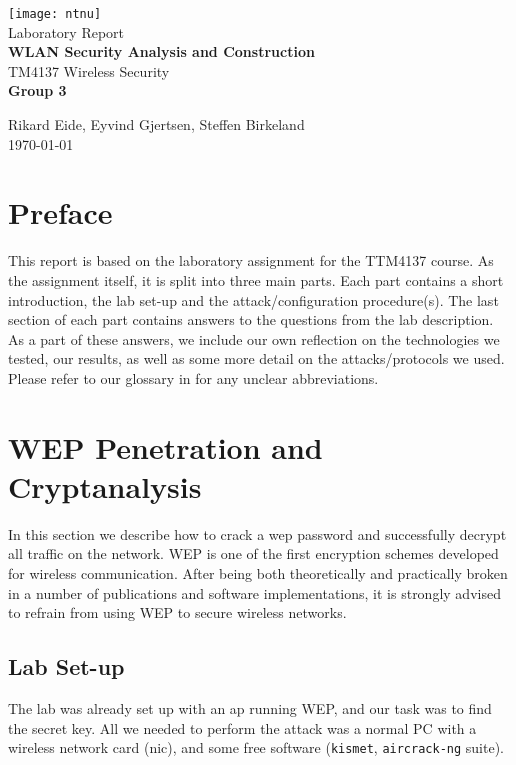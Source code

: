 \documentclass[a4paper,11pt]{article}
\begin{document}
\texttt{[image: ntnu]}\\[1cm]

{\huge Laboratory Report}\\

{\huge \bfseries WLAN Security Analysis and Construction}\\[0.5cm]


{\large TM4137 Wireless Security}\\[1cm]

\textbf{Group 3}

Rikard Eide, Eyvind Gjertsen, Steffen Birkeland\\[0.5cm]

{\large \today}

\newpage

\section*{Preface}

This report is based on the laboratory assignment for the TTM4137 course. As the assignment itself, it is split into three main parts. Each part contains a short introduction, the lab set-up and the attack/configuration procedure(s). The last section of each part contains answers to the questions from the lab description. As a part of these answers, we include our own reflection on the technologies we tested, our results, as well as some more detail on the attacks/protocols we used. Please refer to our glossary in  for any unclear abbreviations.

\section{WEP Penetration and Cryptanalysis}

In this section we describe how to crack a \gls{wep} password and successfully decrypt all traffic on the network. WEP is one of the first encryption schemes developed for wireless communication. After being both theoretically and practically broken in a number of publications and software implementations, it is strongly advised to refrain from using WEP to secure wireless networks.

\subsection{Lab Set-up}
The lab was already set up with an \gls{ap} running WEP, and our task was to find the secret key. All we needed to perform the attack was a normal PC with a wireless network card (\gls{nic}), and some free software (\texttt{kismet}, \texttt{aircrack-ng} suite).
\end{document}
